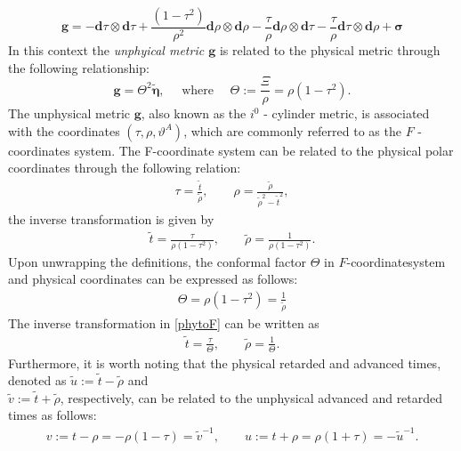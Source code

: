 \begin{equation}\label{eq:unphysicalmetricMink}
\boldsymbol{g}=-\mathbf{d} \tau \otimes \mathbf{d} \tau+\frac{\left(1-\tau^2\right)}{\rho^2} \mathbf{d} \rho \otimes \mathbf{d} \rho-\frac{\tau}{\rho} \mathbf{d} \rho \otimes \mathbf{d} \tau-\frac{\tau}{\rho} \mathbf{d} \tau \otimes \mathbf{d} \rho+\boldsymbol{\sigma}
\end{equation}
In this context the \textit{unphyical metric $\boldsymbol{g}$} is related to the physical metric through the following relationship:
\begin{equation}\label{eq:gandtheta}
\boldsymbol{g}=\Theta^2 \tilde{\boldsymbol{\eta}}, \quad \text { where } \quad \Theta:=\frac{\Xi}{\rho}=\rho\left(1-\tau^2\right).
\end{equation}
The unphysical metric $\boldsymbol{g}$, also known as the $i^0$ - cylinder metric, is associated with the coordinates $(\tau, \rho, \vartheta^A)$, which are commonly referred to as the $F$ - coordinates system.
The F-coordinate system can be related to the physical polar coordinates through the following relation:
\begin{align}\label{Ftophys}
\tau = \frac{\tilde{t}}{\tilde{\rho}}, \qquad \rho = \frac{\tilde{\rho}}{\tilde{\rho}^2-\tilde{t}^2},
\end{align}
the inverse transformation is given by
\begin{align}\label{phytoF}
\tilde{t} = \frac{\tau}{\rho (1-\tau^2)}, \qquad \tilde{\rho}=\frac{1}{\rho (1-\tau^2)}.
\end{align}
Upon unwrapping the definitions, the conformal factor $\Theta$ in $F$-coordinatesystem and physical coordinates can be expressed as follows:
\begin{align}
\Theta = \rho (1-\tau^2) = \frac{1}{\tilde{\rho}}
\end{align}
The inverse transformation in \eqref{phytoF} can be written as
\begin{align}
\tilde{t}=\frac{\tau}{\Theta}, \qquad \tilde{\rho}= \frac{1}{\Theta}.
\end{align}
Furthermore, it is worth noting that the physical retarded and advanced times, denoted as $\tilde{u}:=\tilde{t}- \tilde{\rho}$ and 
\\$ \tilde{v}:= \tilde{t}+ \tilde{\rho}$, respectively, can be related to the unphysical advanced and retarded times as follows:
\begin{align}\label{eq:UnphysPhysAdvRet}
v:=t-\rho=-\rho(1-\tau)=\tilde{v}^{-1}, \qquad u:=t+\rho=\rho(1+\tau)=-\tilde{u}^{-1}.
\end{align}
